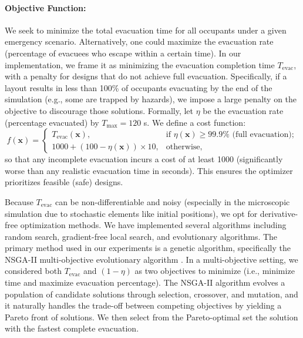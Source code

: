 \documentclass[11pt,a4paper]{article}
\begin{document}
\paragraph{Objective Function:} We seek to minimize the total evacuation time for all occupants under a given emergency scenario. Alternatively, one could maximize the evacuation rate (percentage of evacuees who escape within a certain time). In our implementation, we frame it as minimizing the evacuation completion time $T_{\text{evac}}$, with a penalty for designs that do not achieve full evacuation. Specifically, if a layout results in less than 100\% of occupants evacuating by the end of the simulation (e.g., some are trapped by hazards), we impose a large penalty on the objective to discourage those solutions. Formally, let $\eta$ be the evacuation rate (percentage evacuated) by $T_{\max}=120$ s. We define a cost function:
\[ 
f(\mathbf{x}) = 
\begin{cases}
T_{\text{evac}}(\mathbf{x}) , & \text{if } \eta(\mathbf{x}) \ge 99.9\% \text{ (full evacuation)}; \\
1000 + (100 - \eta(\mathbf{x})) \times 10, & \text{otherwise},
\end{cases}
\] 
so that any incomplete evacuation incurs a cost of at least 1000 (significantly worse than any realistic evacuation time in seconds). This ensures the optimizer prioritizes feasible (safe) designs.

Because $T_{\text{evac}}$ can be non-differentiable and noisy (especially in the microscopic simulation due to stochastic elements like initial positions), we opt for derivative-free optimization methods. We have implemented several algorithms including random search, gradient-free local search, and evolutionary algorithms. The primary method used in our experiments is a genetic algorithm, specifically the NSGA-II multi-objective evolutionary algorithm \cite{Deb2002}. In a multi-objective setting, we considered both $T_{\text{evac}}$ and $(1-\eta)$ as two objectives to minimize (i.e., minimize time and maximize evacuation percentage). The NSGA-II algorithm evolves a population of candidate solutions through selection, crossover, and mutation, and it naturally handles the trade-off between competing objectives by yielding a Pareto front of solutions. We then select from the Pareto-optimal set the solution with the fastest complete evacuation.
\end{document}
